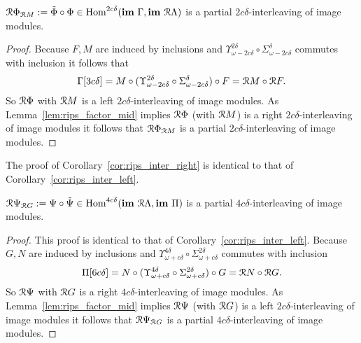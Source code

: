 \begin{corollary}\label{cor:rips_inter_left}
  $\mathcal{R} \Phi_{\mathcal{R} M} := \tilde{\Phi}\circ \Phi\in\mathrm{Hom}^{2c\delta}(\mathbf{im}~\Gamma,\mathbf{im}~\mathcal{R}\Lambda)$ is a partial $2c\delta$-interleaving of image modules.
\end{corollary}
\begin{proof}
  Because $F,M$ are induced by inclusions and $\Upsilon_{\omega-2c\delta}^{2\delta}\circ \Sigma_{\omega-2c\delta}^{\delta}$ commutes with inclusion it follows that
  \[\Gamma[3c\delta] = M\circ (\Upsilon_{\omega-2c\delta}^{2\delta}\circ \Sigma_{\omega-2c\delta}^{\delta})\circ F = \mathcal{R} M\circ \mathcal{R} F.\]
  So $\mathcal{R}\Phi$ with $\mathcal{R} M$ is a left $2c\delta$-interleaving of image modules.
  As Lemma~\ref{lem:rips_factor_mid} implies $\mathcal{R} \Phi$ (with $\mathcal{R} M$) is a right $2c\delta$-interleaving of image modules it follows that $\mathcal{R} \Phi_{\mathcal{R} M}$ is a partial $2c\delta$-interleaving of image modules.
\end{proof}

The proof of Corollary~\ref{cor:rips_inter_right} is identical to that of Corollary~\ref{cor:rips_inter_left}.

\begin{corollary}\label{cor:rips_inter_right}
  $\mathcal{R} \Psi_{\mathcal{R} G} := \Psi\circ\tilde{\Psi}\in\mathrm{Hom}^{4c\delta}(\mathbf{im}~\mathcal{R}\Lambda, \mathbf{im}~\Pi)$ is a partial $4c\delta$-interleaving of image modules.
\end{corollary}
\begin{proof}
  This proof is identical to that of Corollary~\ref{cor:rips_inter_left}.
  Because $G,N$ are induced by inclusions and $\Upsilon_{\omega+c\delta}^{4\delta}\circ \Sigma_{\omega+c\delta}^{2\delta}$ commutes with inclusion
  \[\Pi[6c\delta] = N\circ (\Upsilon_{\omega+c\delta}^{4\delta}\circ \Sigma_{\omega+c\delta}^{2\delta})\circ G = \mathcal{R} N\circ \mathcal{R} G.\]
  So $\mathcal{R}\Psi$ with $\mathcal{R} G$ is a right $4c\delta$-interleaving of image modules.
  As Lemma~\ref{lem:rips_factor_mid} implies $\mathcal{R} \Psi$ (with $\mathcal{R} G$) is a left $2c\delta$-interleaving of image modules it follows that $\mathcal{R} \Psi_{\mathcal{R} G}$ is a partial $4c\delta$-interleaving of image modules.
\end{proof}

